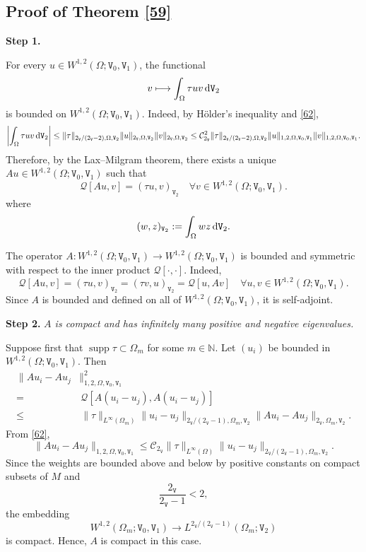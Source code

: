 \documentclass[reqno, 11pt, a4paper]{amsart}
\numberwithin{equation}{section}
\newcommand{\iwe}{ \tau}
\newcommand{\ops}{\mathcal{Q}}
\newcommand{\xv}{2_{\mathtt{V}}}
\newcommand{\womd}{W^{1,2} (\Omega ; \mathtt{V} _0 , \mathtt{V} _1)}
\newcommand{\spt}{\operatorname{supp}}
\newcommand{\wghtv}{\mathtt{V}}
\newcommand{\dwv}{\textnormal{d} \mathtt{V}}
\begin{document}
 
\subsection{Proof of Theorem \ref{59}}

{\bf Step 1.} {For every $u\in\womd$, the functional
$$
v\longmapsto\int_\Omega\iwe uv\,\dwv_2
$$
is bounded on $\womd$. Indeed, by H\"older's inequality and \eqref{62},
$$
\left|\int_\Omega\iwe uv\,\dwv_2\right|
\leq
\|\iwe\|_{\xv/(\xv-2),\Omega,\wghtv_2}
\|u\|_{\xv,\Omega,\wghtv_2}
\|v\|_{\xv,\Omega,\wghtv_2}
\leq
\mathcal C_{\xv}^2
\|\iwe\|_{\xv/(\xv-2),\Omega,\wghtv_2}
\|u\|_{1,2,\Omega,\wghtv_0,\wghtv_1}
\|v\|_{1,2,\Omega,\wghtv_0,\wghtv_1}.
$$
Therefore, by the Lax--Milgram theorem, there exists a unique $Au\in\womd$ such that
$$
\ops[Au,v]
=
( \iwe u , v)_{\wghtv_2} 
\quad\forall v\in\womd.
$$
where 
$$
(w , z)_{\wghtv_2} := \int_\Omega wz\,\dwv_2.
$$

The operator $A:\womd\rightarrow\womd$ is bounded and symmetric with respect to the inner product $\ops[\cdot,\cdot]$. Indeed,
$$
\ops[Au,v]=(\iwe u,v)_{\wghtv_2}=(\iwe v,u)_{\wghtv_2}=\ops[u,Av]
\quad\forall u,v\in\womd.
$$
Since $A$ is bounded and defined on all of $\womd$, it is self-adjoint.}

\medskip

{\bf Step 2.} {\it $A$ is compact and has infinitely many positive and negative eigenvalues.}

\medskip

Suppose first that $\spt\iwe\subset\Omega_m$ for some $m\in\mathbb N$. Let $(u_i)$ be bounded in $\womd$. Then
$$
\begin{aligned}
\|Au_i-Au_j&\|_{1,2,\Omega,\wghtv_0,\wghtv_1}^2\\[3pt]
=&\,\ops[A(u_i-u_j),A(u_i-u_j)]\\[5pt]
\leq&\,\|\iwe\|_{L^\infty(\Omega_m)}
\|u_i-u_j\|_{\xv/(\xv-1),\Omega_m,\wghtv_2}
\|Au_i-Au_j\|_{\xv,\Omega_m,\wghtv_2}.
\end{aligned}
$$
From \eqref{62},
$$
\|Au_i-Au_j\|_{1,2,\Omega,\wghtv_0,\wghtv_1}
\leq
\mathcal C_{\xv}\|\iwe\|_{L^\infty(\Omega)}
\|u_i-u_j\|_{\xv/(\xv-1),\Omega_m,\wghtv_2}.
$$
Since the weights are bounded above and below by positive constants on compact subsets of $M$ and
$$
\frac{\xv}{\xv-1}<2,
$$
the embedding
$$
W^{1,2}(\Omega_m;\wghtv_0,\wghtv_1)
\longrightarrow
L^{\xv/(\xv-1)}(\Omega_m;\wghtv_2)
$$
is compact. Hence, $A$ is compact in this case.
\end{document}
